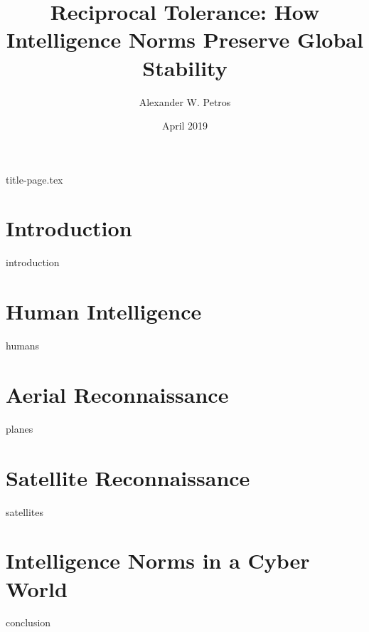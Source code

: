 \documentclass{memoir}
\title{Reciprocal Tolerance: How Intelligence Norms Preserve Global Stability}
\author{Alexander W. Petros}
\date{April 2019}
\begin{document}
    \frontmatter
    {title-page.tex}

    \tableofcontents
    \newpage


    \mainmatter
    \chapter{Introduction}
    {introduction}

    \chapter{Human Intelligence}
    {humans}

    \chapter{Aerial Reconnaissance}
    {planes}

    \chapter{Satellite Reconnaissance}
    {satellites}

    \chapter{Intelligence Norms in a Cyber World}
    {conclusion}
\end{document}
